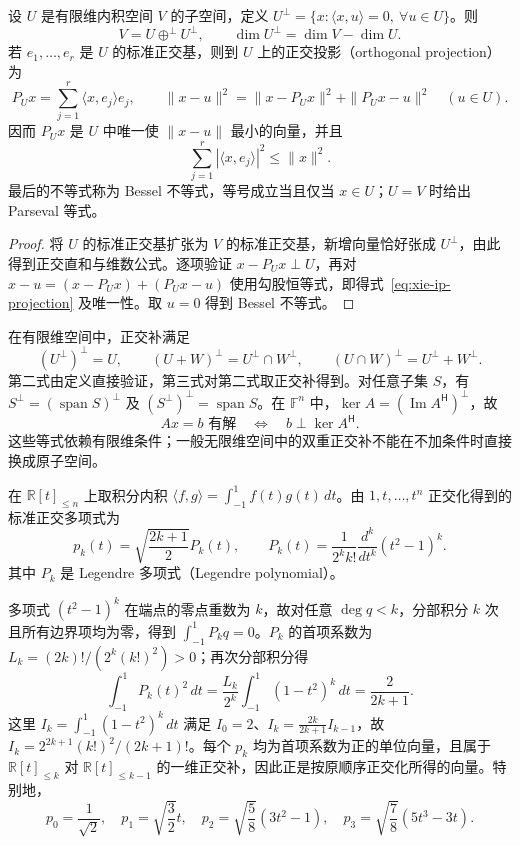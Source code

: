 \begin{theorem}
\label{thm:xie-ip-projection}
设 $U$ 是有限维内积空间 $V$ 的子空间，定义 $U^\perp=\{x:\langle x,u\rangle=0,\ \forall u\in U\}$。则
\[
V=U\mathbin{\oplus^\perp}U^\perp,\qquad \dim U^\perp=\dim V-\dim U.
\]
若 $e_1,\ldots,e_r$ 是 $U$ 的标准正交基，则到 $U$ 上的正交投影（orthogonal projection）为
\begin{equation}
\label{eq:xie-ip-projection}
P_Ux=\sum_{j=1}^r\langle x,e_j\rangle e_j,
\qquad \|x-u\|^2=\|x-P_Ux\|^2+\|P_Ux-u\|^2\quad(u\in U).
\end{equation}
因而 $P_Ux$ 是 $U$ 中唯一使 $\|x-u\|$ 最小的向量，并且
\[
\sum_{j=1}^r|\langle x,e_j\rangle|^2\leq\|x\|^2.
\]
最后的不等式称为 Bessel 不等式，等号成立当且仅当 $x\in U$；$U=V$ 时给出 Parseval 等式。
\end{theorem}
\begin{proof}
将 $U$ 的标准正交基扩张为 $V$ 的标准正交基，新增向量恰好张成 $U^\perp$，由此得到正交直和与维数公式。逐项验证 $x-P_Ux\perp U$，再对 $x-u=(x-P_Ux)+(P_Ux-u)$ 使用勾股恒等式，即得式~\eqref{eq:xie-ip-projection} 及唯一性。取 $u=0$ 得到 Bessel 不等式。
\end{proof}

在有限维空间中，正交补满足
\[
(U^\perp)^\perp=U,\qquad
(U+W)^\perp=U^\perp\cap W^\perp,\qquad
(U\cap W)^\perp=U^\perp+W^\perp.
\]
第二式由定义直接验证，第三式对第二式取正交补得到。对任意子集 $S$，有 $S^\perp=(\operatorname{span}S)^\perp$ 及 $(S^\perp)^\perp=\operatorname{span}S$。在 $\mathbb F^n$ 中，$\ker A=(\operatorname{Im}A^{\mathsf H})^\perp$，故
\begin{equation}
\label{eq:xie-ip-fredholm}
Ax=b\text{ 有解}\quad\Longleftrightarrow\quad b\perp\ker A^{\mathsf H}.
\end{equation}
这些等式依赖有限维条件；一般无限维空间中的双重正交补不能在不加条件时直接换成原子空间。

\begin{example}
在 $\mathbb R[t]_{\leq n}$ 上取积分内积 $\langle f,g\rangle=\int_{-1}^1f(t)g(t)\,dt$。由 $1,t,\ldots,t^n$ 正交化得到的标准正交多项式为
\[
p_k(t)=\sqrt{\frac{2k+1}{2}}P_k(t),\qquad
P_k(t)=\frac1{2^kk!}\frac{d^k}{dt^k}(t^2-1)^k.
\]
其中 $P_k$ 是 Legendre 多项式（Legendre polynomial）。
\end{example}
\begin{solve}
多项式 $(t^2-1)^k$ 在端点的零点重数为 $k$，故对任意 $\deg q<k$，分部积分 $k$ 次且所有边界项均为零，得到 $\int_{-1}^1P_kq=0$。$P_k$ 的首项系数为 $L_k=(2k)!/(2^k(k!)^2)>0$；再次分部积分得
\[
\int_{-1}^1P_k(t)^2\,dt
=\frac{L_k}{2^k}\int_{-1}^1(1-t^2)^k\,dt
=\frac2{2k+1}.
\]
这里 $I_k=\int_{-1}^1(1-t^2)^k\,dt$ 满足 $I_0=2$、$I_k=\frac{2k}{2k+1}I_{k-1}$，故 $I_k=2^{2k+1}(k!)^2/(2k+1)!$。每个 $p_k$ 均为首项系数为正的单位向量，且属于 $\mathbb R[t]_{\leq k}$ 对 $\mathbb R[t]_{\leq k-1}$ 的一维正交补，因此正是按原顺序正交化所得的向量。特别地，
\[
p_0=\frac1{\sqrt2},\quad p_1=\sqrt{\frac32}t,\quad
p_2=\sqrt{\frac58}(3t^2-1),\quad p_3=\sqrt{\frac78}(5t^3-3t).
\]
\end{solve}

